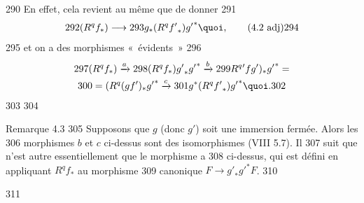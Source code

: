    290	En effet, cela revient au même que de donner
   291	\begin{equation*}
   292	(R^qf_{\ast})\longrightarrow
   293	  g_{\ast}(R^q{f'}_{\ast}){g'}^{\ast}{\quoi},\tag{4.2 adj}
   294	\end{equation*}\label{4.2 adj}
   295	et on a des morphismes « évidents » 
   296	\begin{gather*}
   297	(R^qf_{\ast})\xrightarrow{a}
   298	  (R^qf_{\ast}){g'}_{\ast}{g'}^{\ast}\xrightarrow{b}
   299	  R^q{'}fg')_{\ast}{g'}^{\ast}=\\
   300	=(R^q(gf')_{\ast}{g'}^{\ast}\xrightarrow{c}
   301	  g^{\ast}(R^q{f'}_{\ast}){g'}^{\ast}{\quoi}.
   302	\end{gather*}
   303	
   304	\begin{enonce*}[remark]{Remarque 4.3}
   305	Supposons que $g$ (donc $g'$) soit une immersion fermée. Alors les
   306	morphismes $b$ et $c$ ci-dessus sont des isomorphismes (VIII 5.7). Il
   307	suit que  n'est autre essentiellement que le morphisme a
   308	ci-dessus, qui est défini en appliquant $R^qf_{\ast}$ au morphisme
   309	canonique $F\rightarrow {g'}_{\ast}{g'}^{\ast}F$.
   310	\end{enonce*}
   311	

